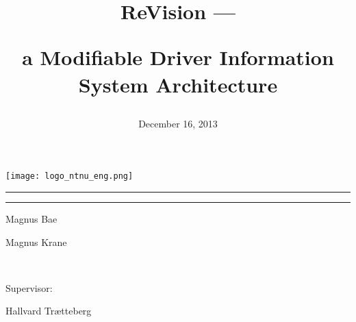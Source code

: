 
\title{ \centerline{ReVision ---} a Modifiable Driver Information System Architecture}
 
\date{ December 16, 2013}


\begin{titlepage}
\begin{center}

\vspace{10mm}
\texttt{[image: logo\_ntnu\_eng.png]}~\\[1cm]
 \vspace{40mm}

\makeatletter
    \parindent \z@
    \reset@font
    \p@
    \par
    \hrule height 2pt
    \par
    \p@
    \huge \@title
    \p@
    \par
    \hrule height 2pt
    \par
    \begin{flushright}
      \large \@date \par
    \end{flushright}
    \p@
 \vspace{20mm}
\begin{minipage}{0.4\textwidth}
\begin{flushleft} \large
\centerline{Magnus Bae}
\centerline{Magnus Krane}
~\\
\centerline{Supervisor:}
\centerline{Hallvard Tr\ae tteberg}
\end{flushleft}
\end{minipage}
 
\vfill
\end{center}
\end{titlepage}
